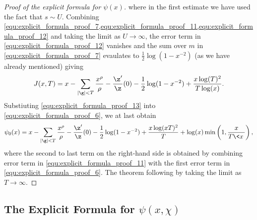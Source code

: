 \begin{proof}[Proof of the explicit formula for $\psi(x)$]
        where in the first estimate we have used the fact that $s \sim U$. Combining \cref{equ:explicit_formula_proof_7,equ:explicit_formula_proof_11,equ:explicit_formula_proof_12} and taking the limit as $U \to \infty$, the error term in \cref{equ:explicit_formula_proof_12} vanishes and the sum over $m$ in \cref{equ:explicit_formula_proof_7} evaulates to $\frac{1}{2}\log(1-x^{-2})$ (as we have already mentioned) giving
        \begin{equation}\label{equ:explicit_formula_proof_13}
          J(x,T) = x-\sum_{|\g| < T}\frac{x^{\rho}}{\rho}-\frac{\z'}{\z}(0)-\frac{1}{2}\log(1-x^{-2})+\frac{x\log(T)^{2}}{T\log(x)}.
        \end{equation}
        Substiuting \cref{equ:explicit_formula_proof_13} into \cref{equ:explicit_formula_proof_6}, we at last obtain
        \[
          \psi_{0}(x) = x-\sum_{|\g| < T}\frac{x^{\rho}}{\rho}-\frac{\z'}{\z}(0)-\frac{1}{2}\log(1-x^{-2})+\frac{x\log(xT)^{2}}{T}+\log(x)\min\left(1,\frac{x}{T\<x\>}\right),
        \]
        where the second to last term on the right-hand side is obtained by combining error term in \cref{equ:explicit_formula_proof_11} with the first error term in \cref{equ:explicit_formula_proof_6}. The theorem following by taking the limit as $T \to \infty$.
      \end{proof}
    \subsection*{The Explicit Formula for \texorpdfstring{$\psi(x,\chi)$}{$\psi(x,\chi)$}}
  \section{}
    \subsection*{}
    \subsection*{}
